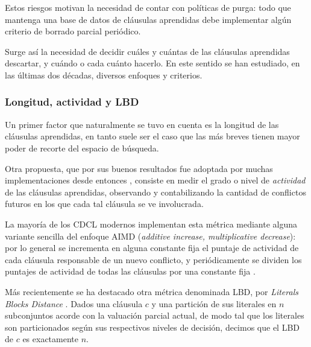 Estos riesgos motivan la necesidad de contar con políticas de purga: todo \ssolver que mantenga una base de datos de cláusulas aprendidas debe implementar algún criterio de borrado parcial periódico.

Surge así la necesidad de decidir cuáles y cuántas de las cláusulas aprendidas descartar, y cuándo o cada cuánto hacerlo. En este sentido se han estudiado, en las últimas dos décadas, diversos enfoques y criterios.



\subsubsection{Longitud, actividad y LBD}

Un primer factor que naturalmente se tuvo en cuenta es la longitud de las cláusulas aprendidas, en tanto suele ser el caso \cite{marques-silva:iccad96} que las más breves tienen mayor poder de recorte del espacio de búsqueda.

Otra propuesta, que por sus buenos resultados fue adoptada por muchas implementaciones desde entonces \cite{goldberg:date02}, consiste en medir el grado o nivel de \emph{actividad} de las cláusulas aprendidas, observando y contabilizando la cantidad de conflictos futuros en los que cada tal cláusula se ve involucrada.

La mayoría de los \ssolvers CDCL modernos implementan esta métrica mediante alguna variante sencilla del enfoque AIMD (\emph{additive increase, multiplicative decrease}): por lo general se incrementa en alguna constante fija el puntaje de actividad de cada cláusula responsable de un nuevo conflicto, y periódicamente se dividen los puntajes de actividad de todas las cláusulas por una constante fija \cite{een:tast03}.

Más recientemente se ha destacado otra métrica denominada LBD, por \emph{Literals Blocks Distance} \cite{Audemard:2009:PLC:1661445.1661509}.%
Dados una cláusula $c$ y una partición de sus literales en $n$ subconjuntos acorde con la valuación parcial actual, de modo tal que los literales son particionados según sus respectivos niveles de decisión, decimos que el LBD de $c$ es exactamente $n$.




